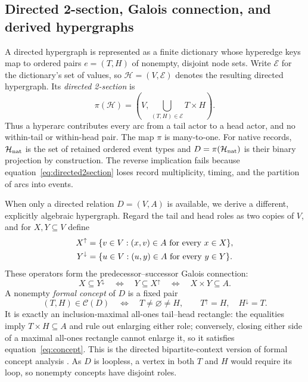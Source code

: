 \documentclass[10pt]{article}
\begin{document}
\subsection{Directed 2-section, Galois connection, and derived hypergraphs}
A directed hypergraph is represented as a finite dictionary whose hyperedge keys map to ordered pairs $e=(T,H)$ of nonempty, disjoint node sets. Write $\mathcal E$ for the dictionary's set of values, so $\mathcal H=(V,\mathcal E)$ denotes the resulting directed hypergraph. Its \emph{directed 2-section} is
\begin{equation}
 \pi(\mathcal H)=\left(V,\bigcup_{(T,H)\in\mathcal E}T\times H\right).
 \label{eq:directed2section}
\end{equation}
Thus a hyperarc contributes every arc from a tail actor to a head actor, and no within-tail or within-head pair.  The map $\pi$ is many-to-one.  For native records, $\mathcal H_{\rm nat}$ is the set of retained ordered event types and $D=\pi(\mathcal H_{\rm nat})$ is their binary projection by construction.  The reverse implication fails because equation~\eqref{eq:directed2section} loses record multiplicity, timing, and the partition of arcs into events.

When only a directed relation $D=(V,A)$ is available, we derive a different, explicitly algebraic hypergraph.  Regard the tail and head roles as two copies of $V$, and for $X,Y\subseteq V$ define
\begin{align}
 X^{\uparrow}&=\{v\in V:(x,v)\in A\ \hbox{for every }x\in X\},\\
 Y^{\downarrow}&=\{u\in V:(u,y)\in A\ \hbox{for every }y\in Y\}.
 \label{eq:galois}
\end{align}
These operators form the predecessor--successor Galois connection:
\begin{equation}
 X\subseteq Y^{\downarrow}\quad\Longleftrightarrow\quad
 Y\subseteq X^{\uparrow}\quad\Longleftrightarrow\quad X\times Y\subseteq A.
 \label{eq:galoisconnection}
\end{equation}
A nonempty \emph{formal concept} of $D$ is a fixed pair
\begin{equation}
 (T,H)\in\mathcal C(D)\quad\Longleftrightarrow\quad
 T\ne\varnothing\ne H,\qquad T^{\uparrow}=H,\quad H^{\downarrow}=T.
 \label{eq:concept}
\end{equation}
It is exactly an inclusion-maximal all-ones tail--head rectangle: the equalities imply $T\times H\subseteq A$ and rule out enlarging either role; conversely, closing either side of a maximal all-ones rectangle cannot enlarge it, so it satisfies equation~\eqref{eq:concept}.  This is the directed bipartite-context version of formal concept analysis \citep{ganterWille1999,zhangEtAl2014}.  As $D$ is loopless, a vertex in both $T$ and $H$ would require its loop, so nonempty concepts have disjoint roles.
\end{document}
